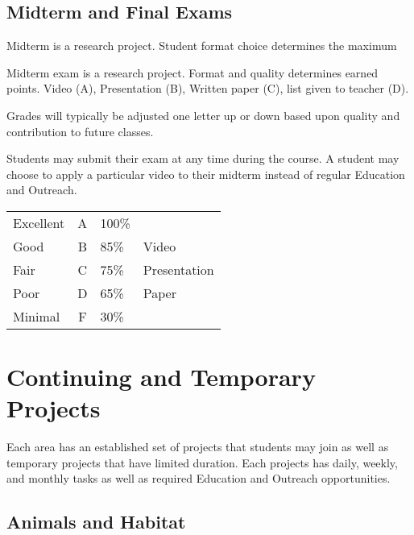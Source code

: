 \documentclass[letterpaper,10pt]{memoir}
\begin{document}
%


\subsection*{Midterm and Final Exams}
%
Midterm is a research project. Student format choice determines the maximum 

Midterm exam is a research project. Format and quality determines earned points. Video (A), Presentation (B), Written paper (C), list given to teacher (D).

Grades will typically be adjusted one letter up or down based upon quality and contribution to future classes.

Students may submit their exam at any time during the course. A student may choose to apply a particular video to their midterm instead of regular Education and Outreach.

{\renewcommand{\arraystretch}{1.35}
\noindent\begin{tabular}{ @{} l c l p{3in} }

	Excellent & A & 100\% & \\

	Good & B & 85\% & Video \\

	Fair & C & 75\% & Presentation \\ 

	Poor & D & 65\% & Paper \\

	Minimal & F & 30\% & \\
\end{tabular}}


\newpage
\section*{Continuing and Temporary Projects}
%
%
\noindent Each area has an established set of projects that students may join as well as temporary projects that have limited duration. Each projects has daily, weekly, and monthly tasks as well as required Education and Outreach opportunities.

\subsection*{Animals and Habitat}
\end{document}
